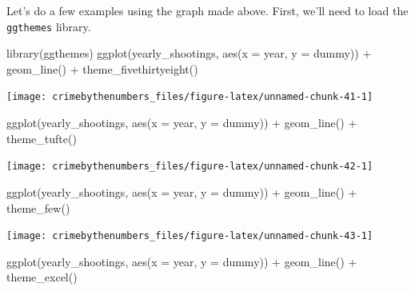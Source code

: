 \documentclass[
  12pt,
  openany]{book}
\newenvironment{Shaded}{\begin{snugshade}}{\end{snugshade}}
\newcommand{\AttributeTok}[1]{\textcolor[rgb]{0.61,0.61,0.61}{#1}}
\newcommand{\FunctionTok}[1]{\textcolor[rgb]{0,0,0}{#1}}
\newcommand{\NormalTok}[1]{#1}
\newcommand{\SpecialCharTok}[1]{\textcolor[rgb]{0,0,0}{#1}}
\begin{document}
Let's do a few examples using the graph made above. First, we'll need to load the \texttt{ggthemes} library.

\begin{Shaded}
\begin{Highlighting}[]
\FunctionTok{library}\NormalTok{(ggthemes)}
\FunctionTok{ggplot}\NormalTok{(yearly\_shootings, }\FunctionTok{aes}\NormalTok{(}\AttributeTok{x =}\NormalTok{ year, }\AttributeTok{y =}\NormalTok{ dummy)) }\SpecialCharTok{+}
  \FunctionTok{geom\_line}\NormalTok{() }\SpecialCharTok{+}
  \FunctionTok{theme\_fivethirtyeight}\NormalTok{()}
\end{Highlighting}
\end{Shaded}

\begin{center}\texttt{[image: crimebythenumbers\_files/figure-latex/unnamed-chunk-41-1]} \end{center}

\begin{Shaded}
\begin{Highlighting}[]
\FunctionTok{ggplot}\NormalTok{(yearly\_shootings, }\FunctionTok{aes}\NormalTok{(}\AttributeTok{x =}\NormalTok{ year, }\AttributeTok{y =}\NormalTok{ dummy)) }\SpecialCharTok{+}
  \FunctionTok{geom\_line}\NormalTok{() }\SpecialCharTok{+}
  \FunctionTok{theme\_tufte}\NormalTok{()}
\end{Highlighting}
\end{Shaded}

\begin{center}\texttt{[image: crimebythenumbers\_files/figure-latex/unnamed-chunk-42-1]} \end{center}

\begin{Shaded}
\begin{Highlighting}[]
\FunctionTok{ggplot}\NormalTok{(yearly\_shootings, }\FunctionTok{aes}\NormalTok{(}\AttributeTok{x =}\NormalTok{ year, }\AttributeTok{y =}\NormalTok{ dummy)) }\SpecialCharTok{+}
  \FunctionTok{geom\_line}\NormalTok{() }\SpecialCharTok{+}
  \FunctionTok{theme\_few}\NormalTok{()}
\end{Highlighting}
\end{Shaded}

\begin{center}\texttt{[image: crimebythenumbers\_files/figure-latex/unnamed-chunk-43-1]} \end{center}

\begin{Shaded}
\begin{Highlighting}[]
\FunctionTok{ggplot}\NormalTok{(yearly\_shootings, }\FunctionTok{aes}\NormalTok{(}\AttributeTok{x =}\NormalTok{ year, }\AttributeTok{y =}\NormalTok{ dummy)) }\SpecialCharTok{+}
  \FunctionTok{geom\_line}\NormalTok{() }\SpecialCharTok{+}
  \FunctionTok{theme\_excel}\NormalTok{()}
\end{Highlighting}
\end{Shaded}
\end{document}

